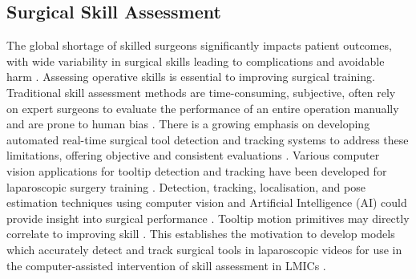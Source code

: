 
\subsection{Surgical Skill Assessment}

The global shortage of skilled surgeons significantly impacts patient outcomes, with wide variability in surgical skills leading to complications and avoidable harm \cite{jin_tool_2018}. Assessing operative skills is essential to improving surgical training. Traditional skill assessment methods are time-consuming, subjective, often rely on expert surgeons to evaluate the performance of an entire operation manually \cite{vassiliou_global_2005, paley_crowdsourced_2021} and are prone to human bias \cite{levin_automated_2019}. There is a growing emphasis on developing automated real-time surgical tool detection and tracking systems to address these limitations, offering objective and consistent evaluations \cite{loza_realtime_2024}. Various computer vision applications for tooltip detection and tracking have been developed for laparoscopic surgery training \cite{matsumoto_laparoscopic_2022}. Detection, tracking, localisation, and pose estimation techniques using computer vision and Artificial Intelligence (AI) could provide insight into surgical performance \cite{bodenstedt_comparative_2018, allan_toward_2013, constable_enhancing_2024}. Tooltip motion primitives may directly correlate to improving skill \cite{retrosi_motion_2015}. This establishes the motivation to develop models which accurately detect and track surgical tools in laparoscopic videos for use in the computer-assisted intervention of skill assessment in LMICs \cite{nwoye_cholectrack20_2023}. 

